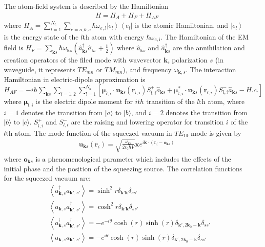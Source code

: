 \documentclass[aps,showpacs,twocolumn,twoside,groupedaddress]{revtex4}
\let\vec\bm
\begin{document}

The atom-field system is described by the Hamiltonian \begin{equation}
  \label{hamltonian}
  \begin{gathered}
H=H_{A}+H_{F}+H_{AF}
 \end{gathered}
\end{equation}
where
$H_{A}=\sum_{l=1}^{N_a}\sum_{e=a,b,c}\hbar\omega_{e,l}\left|e_{l}\right\rangle \left\langle e_{l}\right|$  
is the atomic Hamiltonian, and $ \left|e_{l}\right\rangle $ is the energy state of the $l$th atom with energy $\hbar\omega_{e,l}$. The Hamiltonian of the EM field is
$H_{F}=\sum_{\vec{k}s}\hbar\omega_{\vec{k}s}(\hat{a}_{\vec{k}s}^{\dagger}\hat{a}_{\vec{k}s}+\frac{1}{2})$
where $\hat{a}_{\vec{k}s}$ and $\hat{a}_{\vec{k}s}^{\dagger}$ are the annihilation and creation operators of the filed mode with wavevector $ \vec{k}$, polarization $s$ (in waveguide, it represents $TE_{mn}$ or $TM_{mn}$), and frequency $\omega_{\vec{k},s}$. The interaction Hamiltonian in electric-dipole approximation is
$H_{AF}=-i\hbar\sum_{\vec{k}s}\sum_{i=1,2}\sum_{l=1}^{N_{a}}[\vec{\mu}_{l,i}\cdot\vec{u}_{\vec{k}s}(\vec{r}_{l,i})S_{l,i}^{+}\hat{a}_{\vec{k}s}+\vec{\mu}_{l,i}^{*}\cdot\vec{u}_{\vec{k}s}(\vec{r}_{l,i})S_{l,i}^{-}\hat{a}_{\vec{k}s}-H.c.]$
where $ \vec{\mu}_{l,i} $ is the electric dipole moment for $ith$ transition of the $l$th atom, where $i=1$ denotes the transition from $|a\rangle$ to $|b\rangle$, and $i=2$ denotes the transition from $|b\rangle$ to $|c\rangle$. $ S_{l,i}^{+} $ and $S_{l,i}^{-} $ are the raising and lowering operator for transition $i$ of the $l$th atom. The mode function of the squeezed vacuum in $TE_{10}$ mode is given by
\begin{equation}
  \label{eq2b}
  \begin{gathered}
\vec{u}_{\vec{k}s}(\vec{r}_{i})=\sqrt{\frac{\omega_{\vec{k}s}}{2\epsilon_{0}\hbar V}}\vec{x}e^{i\vec{k}\cdot(\vec{r}_{i}-\vec{o}_{\vec{k}s})}
 \end{gathered}
\end{equation}
where $\vec{o}_{\vec{k}s} $ is a phenomenological parameter which includes the effects of the initial phase and the position of the squeezing source\cite{You2018}. The correlation functions for the squeezed vacuum are\cite{scully1999quantum}:
\begin{equation}
\label{eq0a}
\begin{split}
& \left\langle a_{\vec{k},s}^{\dagger}a_{\vec{k}',s'}\right\rangle =\sinh^{2}r\delta_{\vec{k}'\vec{k}}\delta_{ss'} \\
& \left\langle a_{\vec{k},s}a_{\vec{k}',s'}^{\dagger}\right\rangle =\cosh^{2}r\delta_{\vec{k}'\vec{k}}\delta_{ss'}\\
& \left\langle a_{\vec{k},s}^{\dagger}a_{\vec{k}',s'}^{\dagger}\right\rangle =-e^{-i\theta}\cosh(r)\sinh(r)\delta_{\vec{k}',2\vec{k}_{0}-\vec{k}}\delta_{ss'}\\
&\left\langle a_{\vec{k},s}a_{\vec{k}',s'}\right\rangle =-e^{i\theta}\cosh(r)\sinh(r)\delta_{\vec{k}',2\vec{k}_{0}-\vec{k}}\delta_{ss'}
\end{split}
\end{equation}
\end{document}
